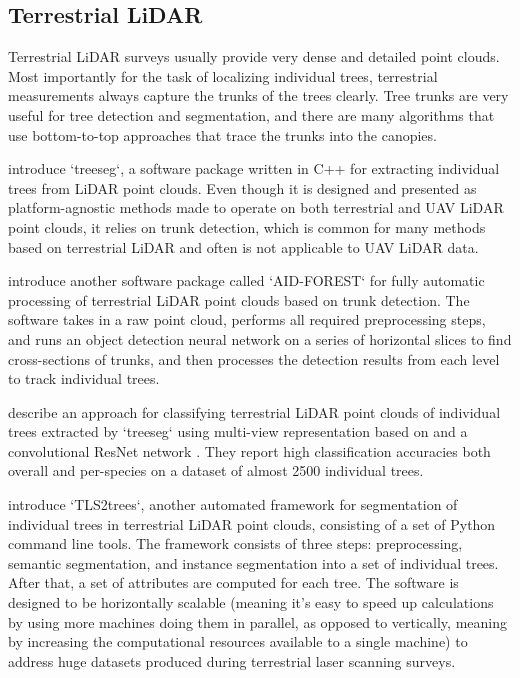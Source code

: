 \subsection{Terrestrial LiDAR}

Terrestrial LiDAR surveys usually provide very dense and detailed point clouds.
Most importantly for the task of localizing individual trees, terrestrial measurements always capture the trunks of the trees clearly.
Tree trunks are very useful for tree detection and segmentation, and there are many algorithms that use bottom-to-top approaches that trace the trunks into the canopies.

\citet{burtExtractingIndividualTrees2018} introduce `treeseg`, a software package written in C++ for extracting individual trees from LiDAR point clouds.
Even though it is designed and presented as platform-agnostic methods made to operate on both terrestrial and UAV LiDAR point clouds, it relies on trunk detection, which is common for many methods based on terrestrial LiDAR and often is not applicable to UAV LiDAR data.

\citet{lopezserranoArtificialIntelligencebasedSoftware2022} introduce another software package called `AID-FOREST` for fully automatic processing of terrestrial LiDAR point clouds based on trunk detection.
The software takes in a raw point cloud, performs all required preprocessing steps, and runs an object detection neural network on a series of horizontal slices to find cross-sections of trunks, and then processes the detection results from each level to track individual trees.

\citet{allenTreeSpeciesClassification2022} describe an approach for classifying terrestrial LiDAR point clouds of individual trees extracted by `treeseg` using multi-view representation based on \citet{goyalRevisitingPointCloud2021} and a convolutional ResNet network \citep{heDeepResidualLearning2016}.
They report high classification accuracies both overall and per-species on a dataset of almost 2500 individual trees.

\citet{wilkesTLS2treesScalableTree2023} introduce `TLS2trees`, another automated framework for segmentation of individual trees in terrestrial LiDAR point clouds, consisting of a set of Python command line tools.
The framework consists of three steps: preprocessing, semantic segmentation, and instance segmentation into a set of individual trees.
After that, a set of attributes are computed for each tree.
The software is designed to be horizontally scalable (meaning it's easy to speed up calculations by using more machines doing them in parallel, as opposed to vertically, meaning by increasing the computational resources available to a single machine) to address huge datasets produced during terrestrial laser scanning surveys.

